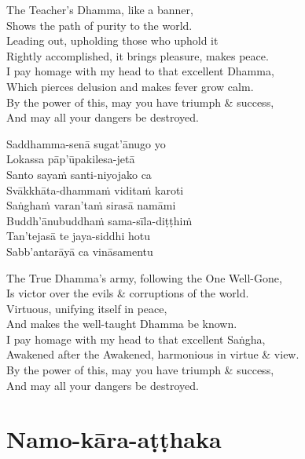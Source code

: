 \begin{english-verses}
  The Teacher's Dhamma, like a banner,\\
  Shows the path of purity to the world.\\
  Leading out, upholding those who uphold it\\
  Rightly accomplished, it brings pleasure, makes peace.\\
  I pay homage with my head to that excellent Dhamma,\\
  Which pierces delusion and makes fever grow calm.\\
  By the power of this, may you have triumph \& success,\\
  And may all your dangers be destroyed.
\end{english-verses}

\begin{pali-hang-continued}
  Saddhamma-senā sugat'ānugo yo\\
  Lokassa pāp'ūpakilesa-jetā\\
  Santo sayaṁ santi-niyojako ca\\
  Svākkhāta-dhammaṁ viditaṁ karoti\\
  Saṅghaṁ varan'taṁ sirasā namāmi\\
  Buddh'ānubuddhaṁ sama-sīla-diṭṭhiṁ\\
  Tan'tejasā te jaya-siddhi hotu\\
  Sabb'antarāyā ca vināsamentu
\end{pali-hang-continued}

\begin{english-verses}
  The True Dhamma's army, following the One Well-Gone,\\
  Is victor over the evils \& corruptions of the world.\\
  Virtuous, unifying itself in peace,\\
  And makes the well-taught Dhamma be known.\\
  I pay homage with my head to that excellent Saṅgha,\\
  Awakened after the Awakened, harmonious in virtue \& view.\\
  By the power of this, may you have triumph \& success,\\
  And may all your dangers be destroyed.
\end{english-verses}

\suttaRef{[Thai]}



\section{Namo-kāra-aṭṭhaka}
\label{namo-kara-atthaka}

